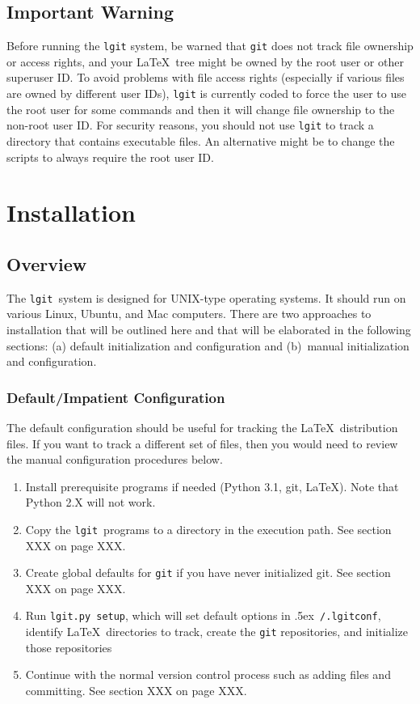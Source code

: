 \documentclass{ltxdoc}
\def\bobtilde{\lower.5ex\hbox{\tt \string~}}%
\def\ucmd#1{{\tt {#1}}}
\def\lgitconf{\bobtilde\ucmd{/.lgitconf}}
\def\lgit{{\tt lgit}}
\begin{document}
\subsection{Important Warning}
Before running the \ucmd{lgit} system, be warned that \ucmd{git} does not track file ownership or access rights, and your \LaTeX\ tree might be owned by the root user or other superuser ID.  To avoid problems with file access rights (especially if various files are owned by different user IDs), \ucmd{lgit} is currently coded to force the user to use the root user for some commands and then it will change file ownership to the non-root user ID.  For security reasons, you should not use \ucmd{lgit} to track a directory that contains executable files. An alternative might be to change the scripts to always require the root user ID.

\section{Installation}
\subsection{Overview}
The \lgit\ system is designed for UNIX-type operating systems.  It should run on various Linux, Ubuntu, and Mac computers. There are two approaches to installation that will be outlined here and that will be elaborated in the following sections: (a) default initialization and configuration and (b)~manual initialization and configuration.
\subsubsection{Default/Impatient Configuration}
The default configuration should be useful for tracking the \LaTeX\ distribution files.  If you want to track a different set of files, then you would need to review the manual configuration procedures below.
\begin{enumerate}
\item{Install prerequisite programs if needed (Python 3.1, git, \LaTeX).  Note     that Python 2.X will not work.}
\item{Copy the \lgit\ programs to a directory in the execution path.  See     section XXX on page XXX.}
\item{Create global defaults for \ucmd{git} if you have never initialized git.     See section XXX on page XXX.}
\item{Run \ucmd{lgit.py setup}, which will set default options in \lgitconf,     identify \LaTeX\ directories to track, create the \ucmd{git} repositories,     and initialize those repositories}
\item{Continue with the normal version control process such as adding files     and committing.  See section XXX on page XXX.}
\end{enumerate}
\end{document}
